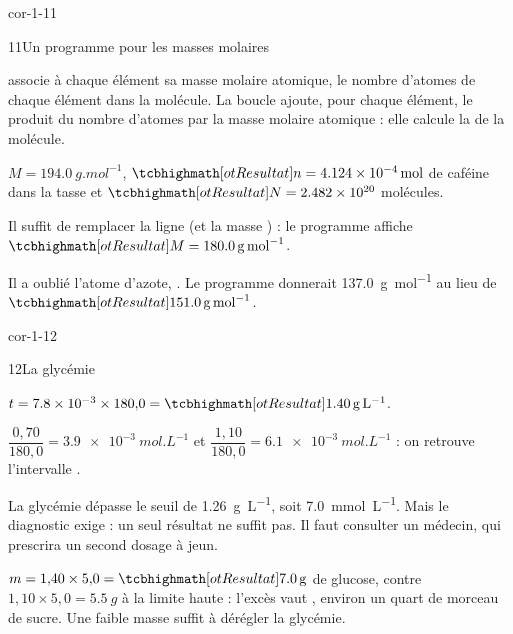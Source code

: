 \begin{blocLivre}{cor-1-11}
\begin{corrige}{11}{Un programme pour les masses molaires}
\begin{questions}
\item {} associe à chaque élément sa masse molaire atomique,  le nombre d'atomes de chaque élément dans
la molécule. La boucle ajoute, pour chaque élément, le produit du nombre d'atomes par la masse molaire atomique : elle
calcule la  de la molécule.
\item $M=\qty{194,0}{g.mol^{-1}}$, $\res{n=\qty{4,124e-4}{mol}}$ de caféine dans la tasse et $\res{N=\num{2.482e20}}$ molécules.
\item Il suffit de remplacer la ligne  (et la masse ) : le programme affiche
$\res{M=\qty{180,0}{g.mol^{-1}}}$.
\item Il a oublié l'atome d'azote, . Le programme donnerait \qty{137,0}{g.mol^{-1}} au lieu de $\res{\qty{151,0}{g.mol^{-1}}}$.
\end{questions}
\end{corrige}
\end{blocLivre}
\begin{blocLivre}{cor-1-12}
\begin{corrige}{12}{La glycémie}
\begin{questions}
\item $t=\num{7.8e-3}\times180{,}0=\res{\qty{1,40}{g.L^{-1}}}$.
\item $\dfrac{0{,}70}{180{,}0}=\qty{3,9e-3}{mol.L^{-1}}$ et $\dfrac{1{,}10}{180{,}0}=\qty{6,1e-3}{mol.L^{-1}}$ : on retrouve l'intervalle .
\item La glycémie dépasse le seuil de \qty{1,26}{g.L^{-1}}, soit \qty{7,0}{mmol.L^{-1}}. Mais le diagnostic exige  : un seul
résultat ne suffit pas. Il faut consulter un médecin, qui prescrira un second dosage à jeun.
\item $m=1{,}40\times5{,}0=\res{\qty{7,0}{g}}$ de glucose, contre $1{,}10\times5{,}0=\qty{5,5}{g}$ à la limite haute : l'excès vaut , environ un quart de
morceau de sucre. Une faible masse suffit à dérégler la glycémie.
\end{questions}
\end{corrige}
\end{blocLivre}
